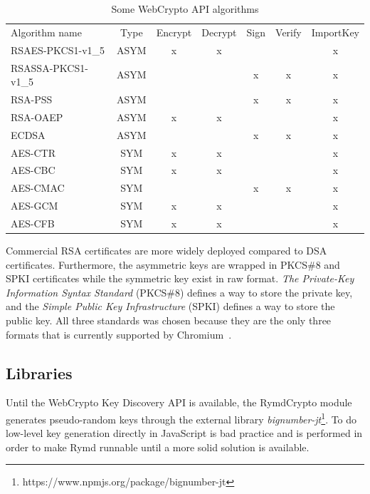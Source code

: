 

\begin{table}[ht]
\centering
\begin{tabular}{lcccccc}
Algorithm name & Type & Encrypt & Decrypt & Sign & Verify & ImportKey \\
RSAES-PKCS1-v1\_5 & ASYM & x & x &  &  & x \\
RSASSA-PKCS1-v1\_5 & ASYM &  &  & x & x & x \\
RSA-PSS & ASYM &  &  & x & x & x \\
RSA-OAEP & ASYM & x & x &  &  & x \\
ECDSA & ASYM &  &  & x & x & x \\
AES-CTR & SYM & x & x &  &  & x \\
AES-CBC & SYM & x & x &  &  & x \\
AES-CMAC & SYM &  &  & x & x & x \\
AES-GCM & SYM & x & x &  &  & x \\
AES-CFB & SYM & x & x &  &  & x
\end{tabular}
\caption{Some WebCrypto API algorithms}
\label{table:webcryptoapi}
\end{table}

Commercial RSA certificates are more widely deployed compared to DSA certificates. Furthermore, the asymmetric keys are wrapped in PKCS\#8 and SPKI certificates while the symmetric key exist in raw format. \emph{The Private-Key Information Syntax Standard} (PKCS\#8) defines a way to store the private key, and the \emph{Simple Public Key Infrastructure} (SPKI) defines a way to store the public key. All three standards was chosen because they are the only three formats that is currently supported by Chromium~\cite{ImplementedChromium:Online}.

\subsection{Libraries}
Until the WebCrypto Key Discovery API is available, the RymdCrypto module generates pseudo-random keys through the external library \emph{bignumber-jt}\footnote{https://www.npmjs.org/package/bignumber-jt}. To do low-level key generation directly in JavaScript is bad practice and is performed in order to make Rymd runnable until a more solid solution is available.

